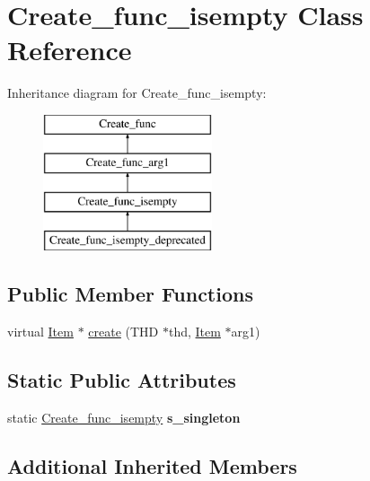 \hypertarget{classCreate__func__isempty}{}\section{Create\+\_\+func\+\_\+isempty Class Reference}
\label{classCreate__func__isempty}
Inheritance diagram for Create\+\_\+func\+\_\+isempty\+:\begin{figure}[H]
\begin{center}
\leavevmode
\includegraphics[height=4.000000cm]{classCreate__func__isempty}
\end{center}
\end{figure}
\subsection*{Public Member Functions}
\begin{DoxyCompactItemize}
\item 
virtual \mbox{\hyperlink{classItem}{Item}} $\ast$ \mbox{\hyperlink{classCreate__func__isempty_aab176e782cca041c5b6e5c24485859e3}{create}} (T\+HD $\ast$thd, \mbox{\hyperlink{classItem}{Item}} $\ast$arg1)
\end{DoxyCompactItemize}
\subsection*{Static Public Attributes}
\begin{DoxyCompactItemize}
\item 
\mbox{\label{classCreate__func__isempty_aa5c432403ba3853cec04537679b52c4d}} 
static \mbox{\hyperlink{classCreate__func__isempty}{Create\+\_\+func\+\_\+isempty}} {\bfseries s\+\_\+singleton}
\end{DoxyCompactItemize}
\subsection*{Additional Inherited Members}


